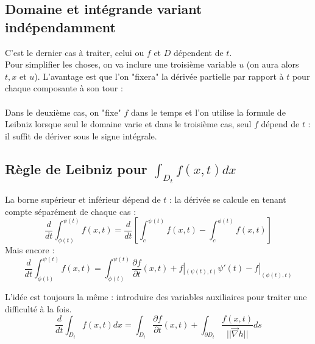 \documentclass[british,french,11pt, a4paper, openany]{book}
\begin{document}
		\subsection{Domaine et intégrande variant indépendamment}
		C'est le dernier cas à traiter, celui ou $f$ et $D$ dépendent de $t$.\\
		Pour simplifier les choses, on va inclure une troisième variable $u$ (on aura alors $t, x$ et $u$). L'avantage est que l'on "fixera" la dérivée partielle par rapport à $t$ pour chaque composante à son tour :\\
									
		\ \\
									
		Dans le deuxième cas, on "fixe" $f$ dans le temps et l'on utilise la formule de Leibniz lorsque seul le domaine varie et dans le troisième cas, seul $f$ dépend de $t$ : il suffit de dériver sous le signe intégrale.
									
		\subsection{Règle de Leibniz pour $\int_{D_t} f(x,t) dx$}
		La borne supérieur et inférieur dépend de $t$ : la dérivée se calcule en tenant compte séparément de chaque cas :
		\begin{equation}
			\frac{d}{dt}\int_{\phi(t)}^{\psi(t)} f(x,t) =  \frac{d}{dt}\left[\int_c^{\psi(t)}f(x,t) - \int_c^{\phi(t)}f(x,t)\right]
		\end{equation}
		Mais encore :
		\begin{equation}
			\frac{d}{dt}\int_{\phi(t)}^{\psi(t)} f(x,t) = \int_{\phi(t)}^{\psi(t)} \frac{\partial f}{\partial t}(x,t) + f|_{(\psi(t),t)} \psi'(t) - f|_{(\phi(t), t)}
		\end{equation}
									
		L'idée est toujours la même : introduire des variables auxiliaires pour traiter une difficulté à la fois.
		\begin{equation}
			\frac{d}{dt}\int_{D_t} f(x,t) dx = \int_{D_t} \frac{\partial f}{\partial t}(x,t) + \int_{\partial D_t} \frac{f(x,t)}{||\vec{\nabla}h||}ds
		\end{equation}
									
\end{document}

